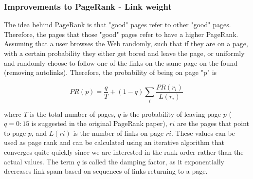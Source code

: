 \subsubsection{Improvements to PageRank - Link weight}

The idea behind PageRank is that "good" pages refer to other "good" pages. Therefore, the pages that those "good" pages refer to have a higher PageRank. Assuming that a user browses the Web randomly, such that if they are on a page, with a certain probability they either get bored and leave the page, or uniformly and randomly choose to follow one of the links on the same page on the found (removing autolinks). Therefore, the probability of being on page "p" is

\begin{equation} 
	\label{eqn:ecuacionWLRank1} 
	PR(p) = \frac{q}{T} + (1 - q) \sum_{i} \frac{PR(r_i)}{L(r_i)} 
\end{equation}

where $T$ is the total number of pages, $q$ is the probability of leaving page $p$ ($q = 0:15$ is suggested in the original PageRank paper), $ri$ are the pages that point to page $p$, and $L(ri)$ is the number of links on page $ri$. These values ​​can be used as page rank and can be calculated using an iterative algorithm that converges quite quickly since we are interested in the rank order rather than the actual values. The term $q$ is called the damping factor, as it exponentially decreases link spam based on sequences of links returning to a page.

